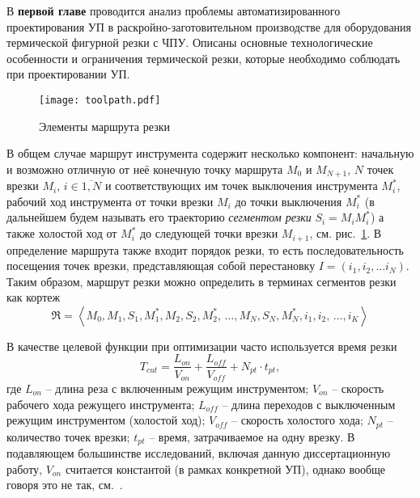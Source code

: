 
В {\bf первой главе}
проводится анализ проблемы автоматизированного проектирования УП
в раскройно-заготовительном производстве для оборудования термической фигурной резки с ЧПУ.
Описаны основные технологические особенности и ограничения термической резки,
которые необходимо соблюдать при проектировании УП.

\begin{figure}[h]
  \centering
  \texttt{[image: toolpath.pdf]}
  \caption{Элементы маршрута резки}
  \label{fig:toolpath}
\end{figure}

В общем случае маршрут инструмента содержит несколько компонент:
начальную и возможно отличную от неё конечную точку маршрута $M_0$ и $M_{N+1}$,
$N$ точек врезки $M_i$, $i \in \overline{1, N}$
и соответствующих им точек выключения инструмента
$M_i^*$,
рабочий ход инструмента от точки врезки $M_i$
до точки выключения $M_i^*$
(в дальнейшем будем называть его траекторию
{\it сегментом резки}
$S_i=M_iM_i^*$)
а также холостой ход от $M_i^*$
до следующей точки врезки $M_{i+1}$,
см. рис.~\ref{fig:toolpath}.
В определение маршрута также входит
порядок резки,
то есть последовательность посещения точек врезки,
представляющая собой перестановку
$I = (i_1, i_2, ... i_N)$.
Таким образом,
маршрут резки можно определить
в терминах сегментов резки как кортеж
\begin{equation}
  \mathfrak{R} = \left<
    M_0, M_1, S_1, M_1^*, M_2, S_2, M_2^*, \,\dots, M_N, S_N, M_N^*,
    i_1, i_2, \,\dots, i_K
  \right>
  \label{eq:route:tuple}
\end{equation}

В качестве целевой функции при оптимизации часто используется время резки
\begin{equation}
  T_{cut} = \frac{L_{on}}{V_{on}} + \frac{L_{off}}{V_{off}} +N_{pt} \cdot t_{pt}
  ,
  \label{eq:cutting-time}
\end{equation}
где
$L_{on}$ -- длина реза с включенным режущим инструментом;
$V_{on}$ -- скорость рабочего хода режущего инструмента;
$L_{off}$ -- длина переходов с выключенным режущим инструментом (холостой ход);
$V_{off}$ -- скорость холостого хода;
$N_{pt}$ -- количество точек врезки;
$t_{pt}$ -- время, затрачиваемое на одну врезку.
В подавляющем большинстве исследований,
включая данную диссертационную работу,
$V_{on}$ считается константой
(в рамках конкретной УП),
однако вообще говоря это не так,
см.~\cite{Obuhovo}.

